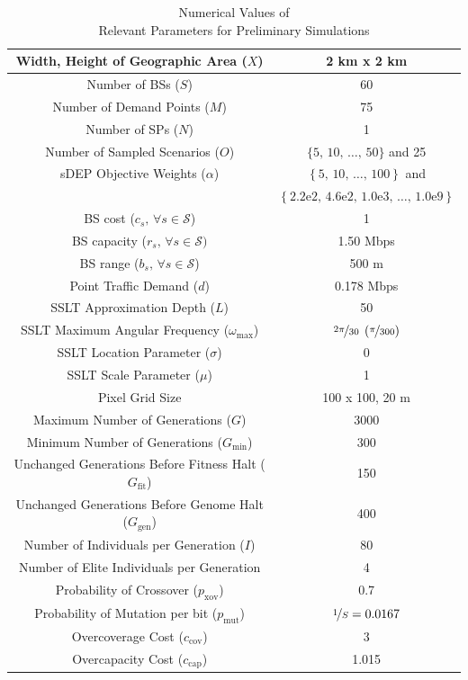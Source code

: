 \documentclass[12pt,dvipsnames]{report}
\newcommand{\expnumber}[2]{{#1}\mathrm{e}{#2}}
\begin{document}
\begin{table}[htp]
\centering
\caption{Numerical Values of\\Relevant Parameters for Preliminary Simulations}
\begin{tabular}{|c|c|} 
\hline
Width, Height of Geographic Area ($X$) & 2 km x 2 km \\
\hline
Number of BSs ($S$) & 60 \\ 
\hline 
Number of Demand Points ($M$) & 75 \\ 
\hline 
Number of SPs ($N$) & 1 \\
\hline
Number of Sampled Scenarios ($O$) & $\{5,\, 10,\, \ldots,\, 50\}$ and 25 \\ 
\hline 
sDEP Objective Weights ($\alpha$) & $\left\{ 5,\, 10,\, \ldots,\, 100 \right\}$ and \\
& $\left\{ \expnumber{2.2}{2},\, \expnumber{4.6}{2},\, \expnumber{1.0}{3},\, \ldots,\, \expnumber{1.0}{9} \right\}$ \\
\hline
BS cost ($c_s,\, \forall s \in \mathcal{S}$) & 1 \\ 
\hline 
BS capacity ($r_s,\, \forall s \in \mathcal{S})$ & 1.50 Mbps \\ 
\hline
BS range ($b_s,\, \forall s \in \mathcal{S}$) & 500 m \\
\hline 
Point Traffic Demand ($d$) & 0.178 Mbps \\ 
\hline 
\hline
SSLT Approximation Depth ($L$) & 50 \\ 
\hline
SSLT Maximum Angular Frequency ($\omega_{\max}$) & $\nicefrac{2 \pi}{30} \; \left( \nicefrac{\pi}{300} \right)$ \\
\hline 
SSLT Location Parameter ($\sigma$) & 0 \\ 
\hline 
SSLT Scale Parameter ($\mu$) & 1 \\ 
\hline
Pixel Grid Size & 100 x 100, 20 m \\
\hline 
\hline
Maximum Number of Generations ($G$) & 3000 \\ 
\hline
Minimum Number of Generations ($G_{\min}$) & 300 \\
\hline
Unchanged Generations Before Fitness Halt ($G_{\text{fit}}$) & 150 \\
\hline 
Unchanged Generations Before Genome Halt ($G_{\text{gen}}$) & 400 \\
\hline 
Number of Individuals per Generation ($I$) & 80 \\ 
\hline
Number of Elite Individuals per Generation & 4 \\
\hline 
Probability of Crossover ($p_\text{xov}$) & 0.7 \\ 
\hline
Probability of Mutation per bit ($p_\text{mut}$) & $\nicefrac{1}{S} = 0.0167$ \\
\hline 
Overcoverage Cost ($c_\text{cov}$) & 3 \\
\hline
Overcapacity Cost ($c_\text{cap}$) & 1.015 \\
\hline
\end{tabular}
\label{tab:Prelim_SimVal}
\end{table}
\end{document}
